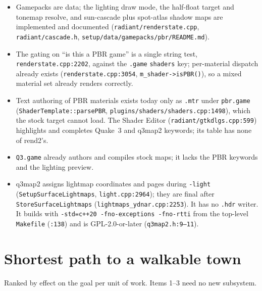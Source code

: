 \documentclass[11pt,a4paper]{article}
\begin{document}
\begin{itemize}
\item Gamepacks are data; the lighting draw mode, the half-float target and tonemap resolve, and
  sun-cascade plus spot-atlas shadow maps are implemented and documented
  (\texttt{radiant/renderstate.cpp}, \texttt{radiant/cascade.h},
  \texttt{setup/data/gamepacks/pbr/README.md}).
\item The gating on ``is this a PBR game'' is a single string test,
  \texttt{renderstate.cpp:2202}, against the \texttt{.game} \texttt{shaders} key; per-material
  dispatch already exists (\texttt{renderstate.cpp:3054}, \texttt{m\_shader->isPBR()}), so a mixed
  material set already renders correctly.
\item Text authoring of PBR materials exists today only as \texttt{.mtr} under \texttt{pbr.game}
  (\texttt{ShaderTemplate::parsePBR}, \texttt{plugins/shaders/shaders.cpp:1498}), which the stock
  target cannot load. The Shader Editor (\texttt{radiant/gtkdlgs.cpp:599}) highlights and completes
  Quake~3 and q3map2 keywords; its table has none of rend2's.
\item \texttt{Q3.game} already authors and compiles stock maps; it lacks the PBR keywords and the
  lighting preview.
\item q3map2 assigns lightmap coordinates and pages during \texttt{-light}
  (\texttt{SetupSurfaceLightmaps}, \texttt{light.cpp:2964}); they are final after
  \texttt{StoreSurfaceLightmaps} (\texttt{lightmaps\_ydnar.cpp:2253}). It has no \texttt{.hdr}
  writer. It builds with \texttt{-std=c++20 -fno-exceptions -fno-rtti} from the top-level
  \texttt{Makefile} (\texttt{:138}) and is GPL-2.0-or-later (\texttt{q3map2.h:9--11}).
\end{itemize}

\section{Shortest path to a walkable town}

Ranked by effect on the goal per unit of work. Items 1--3 need no new subsystem.
\end{document}
